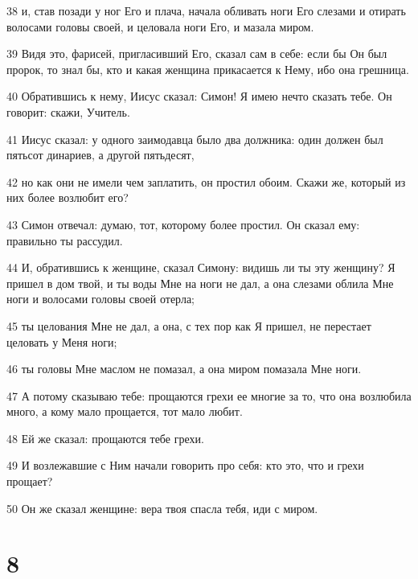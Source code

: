 \par 38 и, став позади у ног Его и плача, начала обливать ноги Его слезами и отирать волосами головы своей, и целовала ноги Его, и мазала миром.
\par 39 Видя это, фарисей, пригласивший Его, сказал сам в себе: если бы Он был пророк, то знал бы, кто и какая женщина прикасается к Нему, ибо она грешница.
\par 40 Обратившись к нему, Иисус сказал: Симон! Я имею нечто сказать тебе. Он говорит: скажи, Учитель.
\par 41 Иисус сказал: у одного заимодавца было два должника: один должен был пятьсот динариев, а другой пятьдесят,
\par 42 но как они не имели чем заплатить, он простил обоим. Скажи же, который из них более возлюбит его?
\par 43 Симон отвечал: думаю, тот, которому более простил. Он сказал ему: правильно ты рассудил.
\par 44 И, обратившись к женщине, сказал Симону: видишь ли ты эту женщину? Я пришел в дом твой, и ты воды Мне на ноги не дал, а она слезами облила Мне ноги и волосами головы своей отерла;
\par 45 ты целования Мне не дал, а она, с тех пор как Я пришел, не перестает целовать у Меня ноги;
\par 46 ты головы Мне маслом не помазал, а она миром помазала Мне ноги.
\par 47 А потому сказываю тебе: прощаются грехи ее многие за то, что она возлюбила много, а кому мало прощается, тот мало любит.
\par 48 Ей же сказал: прощаются тебе грехи.
\par 49 И возлежавшие с Ним начали говорить про себя: кто это, что и грехи прощает?
\par 50 Он же сказал женщине: вера твоя спасла тебя, иди с миром.

\chapter{8}

